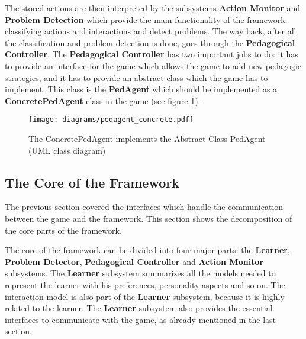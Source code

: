 The stored actions are then interpreted by the subsystems \textbf{Action
Monitor} and \textbf{Problem Detection} which provide the main functionality
of the framework: classifying actions and interactions and detect problems. The
way back, after all the classification and problem detection is done, goes
through the \textbf{Pedagogical Controller}. The \textbf{Pedagogical Controller}
has two important jobs to do: it has to provide an interface for the game
which allows the game to add new pedagogic strategies, and it has to
provide an abstract class which the game has to implement. This
class is the \textbf{PedAgent} which should be implemented as a
\textbf{ConcretePedAgent} class in the game (see figure \ref{pedagent_concrete}).

\begin{figure}
    \centering
    \texttt{[image: diagrams/pedagent\_concrete.pdf]}
    \caption[The ConcretePedAgent implements the Abstract Class PedAgent (UML class diagram)]
    {The ConcretePedAgent implements the Abstract Class PedAgent (UML class diagram)}
    \label{pedagent_concrete}
\end{figure}

\subsection{The Core of the Framework}
\label{core_framework}
The previous section covered the interfaces which handle the communication between
the game and the framework. This section shows the decomposition of the core
parts of the framework.

The core of the framework can be divided into four major parts: the
\textbf{Learner}, \textbf{Problem Detector}, \textbf{Pedagogical Controller}
and \textbf{Action Monitor} subsystems. The \textbf{Learner} subsystem
summarizes all the models needed to represent the learner with his
preferences, personality aspects and so on. The interaction model is also part
of the \textbf{Learner} subsystem, because it is highly related to the learner.
The \textbf{Learner} subsystem also provides the essential interfaces to
communicate with the game, as already mentioned in the last section.



